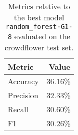 \begin{table}[H]
\centering
\capstart
\begin{tabularx}{0.48\textwidth}{|X|r|}
\hline
Metric & Value \\
\hline
Accuracy & 36.16\% \\
Precision & 32.33\% \\
Recall & 30.60\% \\
F1 & 30.26\% \\
\hline
\end{tabularx}
\caption{Metrics relative to the best model \texttt{random\_forest-G1-8} evaluated on the crowdflower test set.}
\label{tab:best_model_metrics_crowdflower_test}

\end{table}
